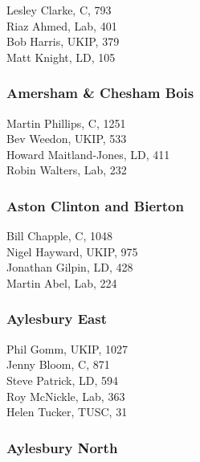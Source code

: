 \documentclass[a4paper,openany,10pt]{book}
\begin{document}
Lesley Clarke, C, 793\\
Riaz Ahmed, Lab, 401\\
Bob Harris, UKIP, 379\\
Matt Knight, LD, 105\\


\subsubsection*{Amersham \& Chesham Bois}



Martin Phillips, C, 1251\\
Bev Weedon, UKIP, 533\\
{Howard Maitland-Jones}, LD, 411\\
Robin Walters, Lab, 232\\


\subsubsection*{Aston Clinton and Bierton}



Bill Chapple, C, 1048\\
Nigel Hayward, UKIP, 975\\
Jonathan Gilpin, LD, 428\\
Martin Abel, Lab, 224\\


\subsubsection*{Aylesbury East}



Phil Gomm, UKIP, 1027\\
Jenny Bloom, C, 871\\
Steve Patrick, LD, 594\\
Roy McNickle, Lab, 363\\
Helen Tucker, TUSC, 31\\


\subsubsection*{Aylesbury North}
\end{document}
